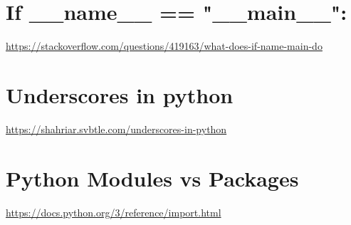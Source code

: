 \begin{fullpage}
\section{If \_\_name\_\_ == "\_\_main\_\_":}
\url{https://stackoverflow.com/questions/419163/what-does-if-name-main-do}

\section{Underscores in python}
\url{https://shahriar.svbtle.com/underscores-in-python}


\section{Python Modules vs Packages}
\url{https://docs.python.org/3/reference/import.html}





%

\renewcommand{\bibname}{References}
 

\end{fullpage}

%

%



